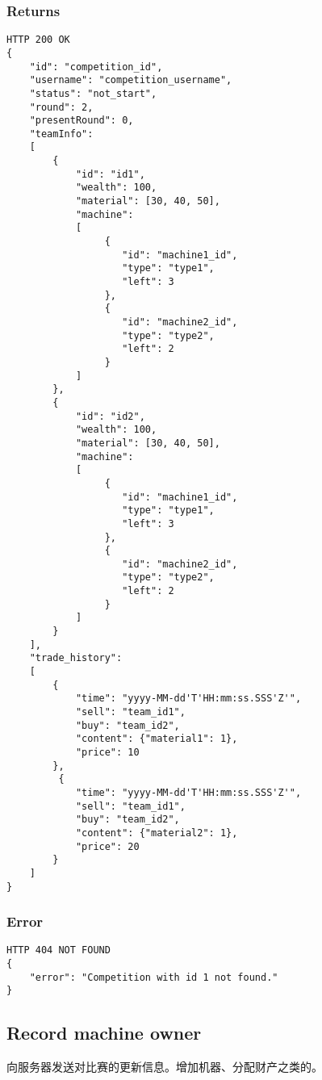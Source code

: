 \documentclass{article}
\begin{document}
\subsubsection*{Returns}
\begin{lstlisting}
HTTP 200 OK
{
    "id": "competition_id",
    "username": "competition_username",
    "status": "not_start",
    "round": 2,
    "presentRound": 0,
    "teamInfo":
    [
        {
            "id": "id1",
            "wealth": 100,
            "material": [30, 40, 50],
            "machine":
            [
                 {
                    "id": "machine1_id",
                    "type": "type1",
                    "left": 3
                 },
                 {
                    "id": "machine2_id",
                    "type": "type2",
                    "left": 2
                 }
            ]
        },
        {
            "id": "id2",
            "wealth": 100,
            "material": [30, 40, 50],
            "machine":
            [
                 {
                    "id": "machine1_id",
                    "type": "type1",
                    "left": 3
                 },
                 {
                    "id": "machine2_id",
                    "type": "type2",
                    "left": 2
                 }
            ]
        }
    ],
    "trade_history":
    [
        {
            "time": "yyyy-MM-dd'T'HH:mm:ss.SSS'Z'",
            "sell": "team_id1",
            "buy": "team_id2",
            "content": {"material1": 1},
            "price": 10
        },
         {
            "time": "yyyy-MM-dd'T'HH:mm:ss.SSS'Z'",
            "sell": "team_id1",
            "buy": "team_id2",
            "content": {"material2": 1},
            "price": 20
        }
    ]
}

\end{lstlisting}

\subsubsection*{Error}
\begin{lstlisting}
HTTP 404 NOT FOUND
{
    "error": "Competition with id 1 not found."
}
\end{lstlisting}

\subsection{Record machine owner}
向服务器发送对比赛的更新信息。增加机器、分配财产之类的。
\end{document}
